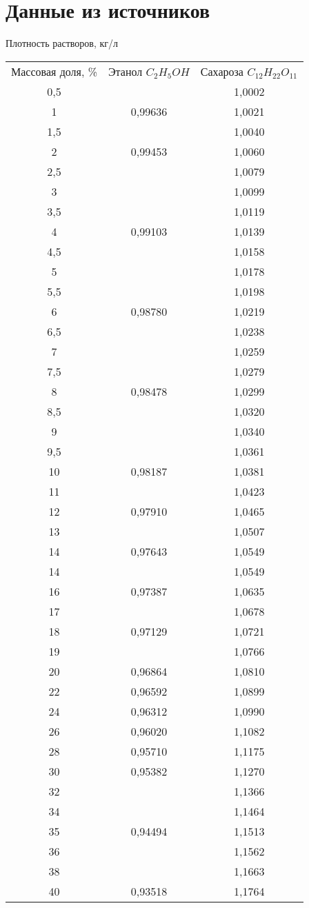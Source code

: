 \section{Данные из источников}

Плотность растворов, кг/л

\begin{tabular}{ccc}
Массовая доля, \% 
& Этанол $C_2H_5OH$
& Сахароза $C_{12}H_{22}O_{11}$ \\
0,5	&         & 1,0002 \\
1	& 0,99636 & 1,0021 \\
1,5	&         & 1,0040 \\
2	& 0,99453 & 1,0060 \\
2,5	&         & 1,0079 \\
3	&         & 1,0099 \\
3,5	&         & 1,0119 \\
4	& 0,99103 & 1,0139 \\
4,5	&         & 1,0158 \\
5	&         & 1,0178 \\
5,5	&         & 1,0198 \\
6	& 0,98780 & 1,0219 \\
6,5	&         & 1,0238 \\
7	&         & 1,0259 \\
7,5	&         & 1,0279 \\
8	& 0,98478 & 1,0299 \\
8,5	&         & 1,0320 \\
9	&         & 1,0340 \\
9,5	&         & 1,0361 \\
10	& 0,98187 & 1,0381 \\
11	&         & 1,0423 \\
12	& 0,97910 & 1,0465 \\
13	&         & 1,0507 \\
14	& 0,97643 & 1,0549 \\
14	&         & 1,0549 \\
16	& 0,97387 & 1,0635 \\
17	&         & 1,0678 \\
18	& 0,97129 & 1,0721 \\
19	&         & 1,0766 \\
20	& 0,96864 & 1,0810 \\
22	& 0,96592 & 1,0899 \\
24	& 0,96312 & 1,0990 \\
26	& 0,96020 & 1,1082 \\
28	& 0,95710 & 1,1175 \\
30	& 0,95382 & 1,1270 \\
32	&         & 1,1366 \\
34	&         & 1,1464 \\
35	& 0,94494 & 1,1513 \\
36	&         & 1,1562 \\
38	&         & 1,1663 \\
40	& 0,93518 & 1,1764 \\
\end{tabular}

